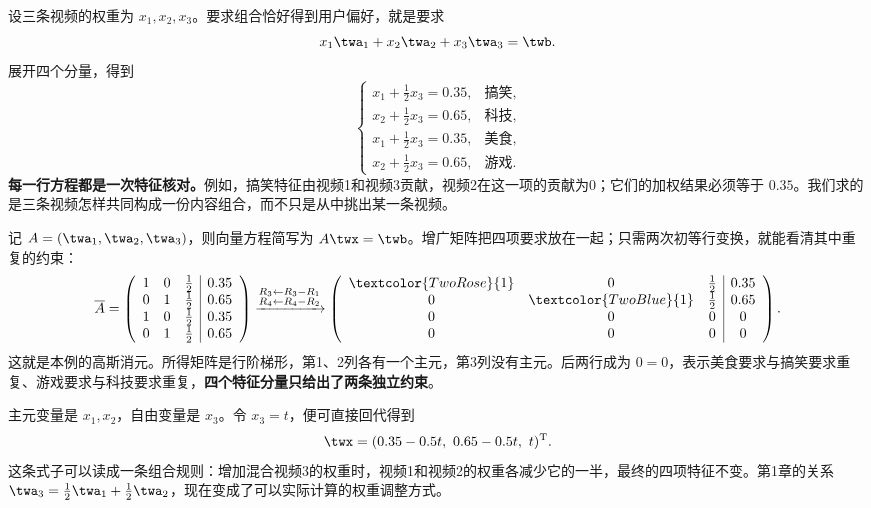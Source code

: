 \documentclass[a4paper,12pt,twoside,openany,fontset=none]{ctexbook}
\newcommand{\R}{\mathbb{R}}
\numberwithin{equation}{chapter}
\begin{document}
设三条视频的权重为 $x_1,x_2,x_3$。要求组合恰好得到用户偏好，就是要求
\[
    x_1\twa_1+x_2\twa_2+x_3\twa_3=\twb.
\]
展开四个分量，得到
\[
    \begin{cases}
        x_1+\tfrac12x_3=0.35, &\text{搞笑},\\
        x_2+\tfrac12x_3=0.65, &\text{科技},\\
        x_1+\tfrac12x_3=0.35, &\text{美食},\\
        x_2+\tfrac12x_3=0.65, &\text{游戏}.
    \end{cases}
\]
\textbf{每一行方程都是一次特征核对。}例如，搞笑特征由视频1和视频3贡献，视频2在这一项的贡献为0；它们的加权结果必须等于 $0.35$。我们求的是三条视频怎样共同构成一份内容组合，而不只是从中挑出某一条视频。

记 $A=(\twa_1,\twa_2,\twa_3)$，则向量方程简写为 $A\twx=\twb$。增广矩阵把四项要求放在一起；只需两次初等行变换，就能看清其中重复的约束：
\[
 \overline A=
 \left(\begin{array}{ccc|c}
 1&0&\tfrac12&0.35\\
 0&1&\tfrac12&0.65\\
 1&0&\tfrac12&0.35\\
 0&1&\tfrac12&0.65
 \end{array}\right)
 \xrightarrow{\substack{R_3\leftarrow R_3-R_1\\R_4\leftarrow R_4-R_2}}
 \left(\begin{array}{ccc|c}
 \textcolor{TwoRose}{1}&0&\tfrac12&0.35\\
 0&\textcolor{TwoBlue}{1}&\tfrac12&0.65\\
 0&0&0&0\\
 0&0&0&0
 \end{array}\right).
\]
这就是本例的高斯消元。所得矩阵是行阶梯形，第1、2列各有一个主元，第3列没有主元。后两行成为 $0=0$，表示美食要求与搞笑要求重复、游戏要求与科技要求重复，\textbf{四个特征分量只给出了两条独立约束}。

\clearpage
主元变量是 $x_1,x_2$，自由变量是 $x_3$。令 $x_3=t$，便可直接回代得到
\[
    \twx=(0.35-0.5t,\ 0.65-0.5t,\ t)^{\mathrm T}.
\]
这条式子可以读成一条组合规则：增加混合视频3的权重时，视频1和视频2的权重各减少它的一半，最终的四项特征不变。第1章的关系 $\twa_3=\tfrac12\twa_1+\tfrac12\twa_2$，现在变成了可以实际计算的权重调整方式。
\end{document}
